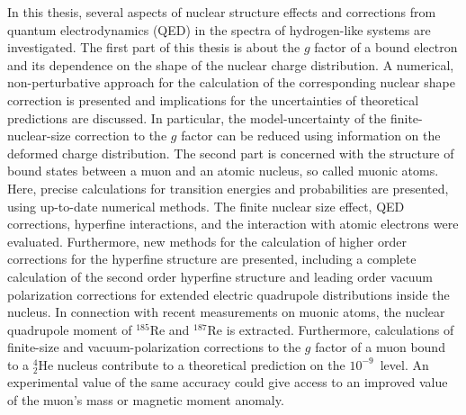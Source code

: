 
{\small
In this thesis, several aspects of nuclear structure effects and corrections from quantum electrodynamics (QED) in the spectra of hydrogen-like systems are investigated. The first part of this thesis is about the $g$ factor of a bound electron and its dependence on the shape of the nuclear charge distribution. 
A numerical, non-perturbative approach for the calculation of the corresponding nuclear shape correction is presented and implications for the uncertainties of theoretical predictions are discussed. In particular, the model-uncertainty of the finite-nuclear-size correction to the $g$ factor can be reduced using information on the deformed charge distribution.
The second part is concerned with the structure of bound states between a muon and an atomic nucleus, so called muonic atoms. Here, precise calculations for transition energies and probabilities are presented, using up-to-date numerical methods. The finite nuclear size effect, QED corrections, hyperfine interactions, and the interaction with atomic electrons were evaluated. 
Furthermore, new methods for the calculation of higher order corrections for the hyperfine structure are presented, including a complete calculation of the second order hyperfine structure and leading order vacuum polarization corrections for extended electric quadrupole distributions inside the nucleus. 
In connection with recent measurements on muonic atoms, the nuclear quadrupole moment of $^{185}$Re and $^{187}$Re is extracted.
Furthermore, calculations of finite-size and vacuum-polarization corrections to the $g$ factor of a muon bound to a $^{4}_2$He nucleus contribute to a theoretical prediction on the $10^{-9}$~level. An experimental value of the same accuracy could give access to an improved value of the muon's mass or magnetic moment anomaly.
}

\thispagestyle{empty}
